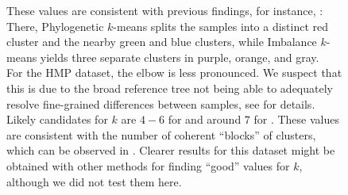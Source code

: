 \begin{figure}[hpbt]
{        These values are consistent with previous findings, for instance, :
        There, Phylogenetic $k$-means splits the samples into a distinct red cluster and the nearby green and blue clusters,
        while Imbalance $k$-means yields three separate clusters in purple, orange, and gray.
        \\
        For the HMP dataset, the elbow is less pronounced.
        We suspect that this is due to the broad reference tree not being able to adequately
        resolve fine-grained differences between samples,
        see  for details.
        Likely candidates for $k$ are $4-6$ for 
        and around $7$ for .
        These values are consistent with the number of coherent ``blocks'' of clusters,
        which can be observed in .
        Clearer results for this dataset might be obtained with other methods for finding ``good'' values for $k$,
        although we did not test them here.
    }
    \label{fig:elbows}
\end{figure}

